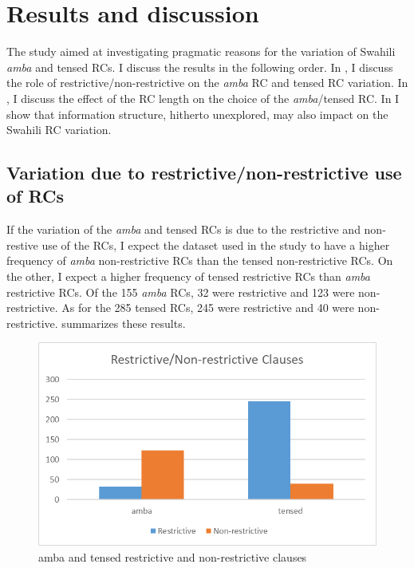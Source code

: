 \documentclass[output=paper,colorlinks,citecolor=brown]{langscibook}
\begin{document}
\section{Results and discussion}\label{sec:mwamzandi:4}

The study aimed at investigating pragmatic reasons for the variation of Swahili \textit{amba} and tensed RCs. I discuss the results in the following order. In , I discuss the role of restrictive/non-restrictive on the \textit{amba} RC and tensed RC variation. In , I discuss the effect of the RC length on the choice of the \textit{amba}/tensed RC. In  I show that information structure, hitherto unexplored, may also impact on the Swahili RC variation.

\subsection{Variation due to restrictive/non-restrictive use of RCs}\label{sec:mwamzandi:4.1}

If the variation of the \textit{amba} and tensed RCs is due to the restrictive and non-restive use of the RCs, I expect the dataset used in the study to have a higher frequency of \textit{amba} non-restrictive RCs than the tensed non-restrictive RCs. On the other, I expect a higher frequency of tensed restrictive RCs than \textit{amba} restrictive RCs. Of the 155 \textit{amba} RCs, 32 were restrictive and 123 were non-restrictive. As for the 285 tensed RCs, 245 were restrictive and 40 were non-restrictive.  summarizes these results.

\begin{figure}
    \includegraphics[width=\textwidth]{figures/MwamzandiFig1.png}
    \caption{amba and tensed restrictive and non-restrictive clauses}
    \label{fig:mwamzandi:1}
\end{figure}
\end{document}
